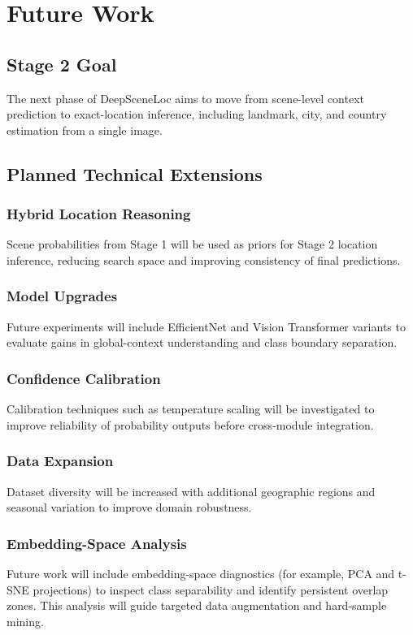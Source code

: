 \chapter{Future Work}

\section{Stage 2 Goal}
The next phase of DeepSceneLoc aims to move from scene-level context prediction to exact-location inference, including landmark, city, and country estimation from a single image.

\section{Planned Technical Extensions}
\subsection{Hybrid Location Reasoning}
Scene probabilities from Stage 1 will be used as priors for Stage 2 location inference, reducing search space and improving consistency of final predictions.

\subsection{Model Upgrades}
Future experiments will include EfficientNet and Vision Transformer variants to evaluate gains in global-context understanding and class boundary separation.

\subsection{Confidence Calibration}
Calibration techniques such as temperature scaling will be investigated to improve reliability of probability outputs before cross-module integration.

\subsection{Data Expansion}
Dataset diversity will be increased with additional geographic regions and seasonal variation to improve domain robustness.

\subsection{Embedding-Space Analysis}
Future work will include embedding-space diagnostics (for example, PCA and t-SNE projections) to inspect class separability and identify persistent overlap zones. This analysis will guide targeted data augmentation and hard-sample mining.

